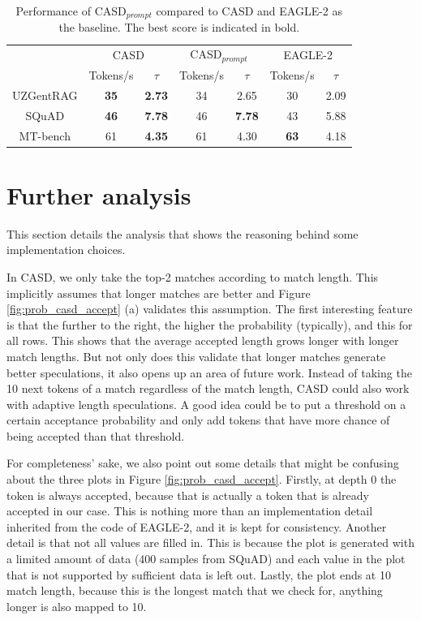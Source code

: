 \begin{table}[h]
  \centering
  \begin{tabular}{ccc|cc|cc}
      & \multicolumn{2}{c}{CASD} & \multicolumn{2}{c}{CASD$_{prompt}$} & \multicolumn{2}{c}{EAGLE-2} \\
      \cline{2-7}
      & Tokens/s & $\tau$ & Tokens/s & $\tau$ & Tokens/s & $\tau$ \\
      \hline
      UZGentRAG & \textbf{35} & \textbf{2.73} & 34 & 2.65 & 30 & 2.09 \\
      SQuAD     & \textbf{46} & \textbf{7.78} & 46 & \textbf{7.78} & 43 & 5.88 \\
      MT-bench  & 61 & \textbf{4.35} & 61 & 4.30 & \textbf{63} & 4.18 \\
      \hline
  \end{tabular}
  \caption{Performance of CASD$_{prompt}$ compared to CASD and EAGLE-2 as the baseline. The best score is indicated in bold.}
  \label{tab:ablation_benchmarks}
\end{table}

\section{Further analysis}
\label{sec:further_analysis}
This section details the analysis that shows the reasoning behind some implementation choices.

In CASD, we only take the top-2 matches according to match length. This implicitly assumes that longer matches are better and Figure \ref{fig:prob_casd_accept} (a) validates this assumption. The first interesting feature is that the further to the right, the higher the probability (typically), and this for all rows. This shows that the average accepted length grows longer with longer match lengths. But not only does this validate that longer matches generate better speculations, it also opens up an area of future work. Instead of taking the 10 next tokens of a match regardless of the match length, CASD could also work with adaptive length speculations. A good idea could be to put a threshold on a certain acceptance probability and only add tokens that have more chance of being accepted than that threshold. 

For completeness' sake, we also point out some details that might be confusing about the three plots in Figure \ref{fig:prob_casd_accept}. Firstly, at depth 0 the token is always accepted, because that is actually a token that is already accepted in our case. This is nothing more than an implementation detail inherited from the code of EAGLE-2, and it is kept for consistency. Another detail is that not all values are filled in. This is because the plot is generated with a limited amount of data (400 samples from SQuAD) and each value in the plot that is not supported by sufficient data is left out. Lastly, the plot ends at 10 match length, because this is the longest match that we check for, anything longer is also mapped to 10. 

